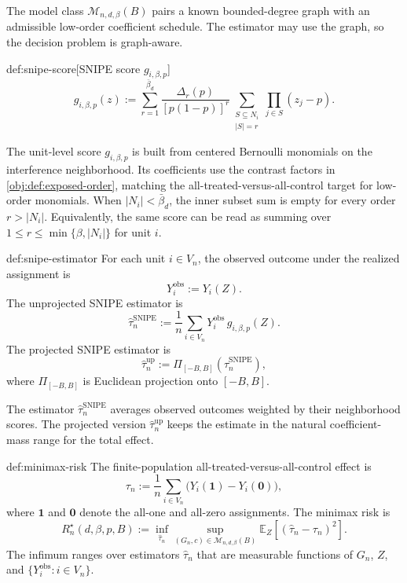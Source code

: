 \documentclass[11pt]{article}
\begin{document}
The model class \(\mathcal M_{n,d,\beta}(B)\) pairs a known bounded-degree graph with an admissible low-order coefficient schedule. The estimator may use the graph, so the decision problem is graph-aware.

\begin{definitionv}{def:snipe-score}[SNIPE score $g_{i,\beta,p}$]
\[
g_{i,\beta,p}(z)
:=
\sum_{r=1}^{\bar\beta_d}
\frac{\Delta_r(p)}{[p(1-p)]^r}
\sum_{\substack{S\subseteq N_i\\ |S|=r}}
\prod_{j\in S}(z_j-p).
\]
\end{definitionv}

The unit-level score \(g_{i,\beta,p}\) is built from centered Bernoulli monomials on the interference neighborhood. Its coefficients use the contrast factors in \cref{obj:def:exposed-order}, matching the all-treated-versus-all-control target for low-order monomials. When \(|N_i|<\bar\beta_d\), the inner subset sum is empty for every order \(r>|N_i|\). Equivalently, the same score can be read as summing over \(1\le r\le \min\{\beta,|N_i|\}\) for unit \(i\).

\begin{definitionv}{def:snipe-estimator}
For each unit \(i\in V_n\), the observed outcome under the realized assignment is
\[
Y_i^{\mathrm{obs}}:=Y_i(Z).
\]
The unprojected SNIPE estimator is
\[
\widehat\tau_n^{\mathrm{SNIPE}}
:=
\frac{1}{n}
\sum_{i\in V_n}
Y_i^{\mathrm{obs}}\,g_{i,\beta,p}(Z).
\]
The projected SNIPE estimator is
\[
\widehat\tau_n^{\mathrm{up}}
:=
\Pi_{[-B,B]}
\left(
\widehat\tau_n^{\mathrm{SNIPE}}
\right),
\]
where \(\Pi_{[-B,B]}\) is Euclidean projection onto \([-B,B]\).
\end{definitionv}

The estimator \(\widehat\tau_n^{\mathrm{SNIPE}}\) averages observed outcomes weighted by their neighborhood scores. The projected version \(\widehat\tau_n^{\mathrm{up}}\) keeps the estimate in the natural coefficient-mass range for the total effect.

\begin{definitionv}{def:minimax-risk}
The finite-population all-treated-versus-all-control effect is
\[
\tau_n:=\frac{1}{n}\sum_{i\in V_n}\bigl(Y_i(\mathbf 1)-Y_i(\mathbf 0)\bigr),
\]
where \(\mathbf 1\) and \(\mathbf 0\) denote the all-one and all-zero assignments. The minimax risk is
\[
R_n^\star(d,\beta,p,B)
:=
\inf_{\widehat\tau_n}
\sup_{(G_n,c)\in\mathcal M_{n,d,\beta}(B)}
\mathbb E_Z
\left[
\left(
\widehat\tau_n-\tau_n
\right)^2
\right].
\]
The infimum ranges over estimators \(\widehat\tau_n\) that are measurable functions of \(G_n\), \(Z\), and \(\{Y_i^{\mathrm{obs}}:i\in V_n\}\).
\end{definitionv}
\end{document}
